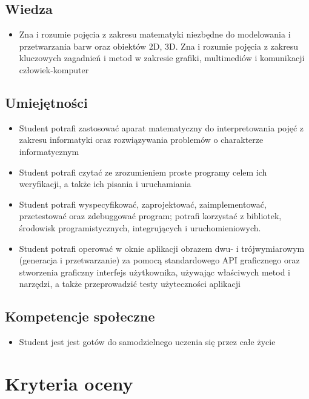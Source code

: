 \documentclass[12pt, a4paper]{article}
\begin{document}
\subsection*{Wiedza}
\begin{itemize}
  \item Zna i rozumie pojęcia z zakresu matematyki niezbędne do modelowania i przetwarzania barw oraz obiektów 2D, 3D. Zna i rozumie pojęcia z zakresu kluczowych zagadnień i metod w zakresie grafiki, multimediów i komunikacji człowiek-komputer
\end{itemize}

\subsection*{Umiejętności}
\begin{itemize}
  \item Student potrafi zastosować aparat matematyczny do interpretowania pojęć z zakresu informatyki oraz rozwiązywania problemów o charakterze informatycznym
  \item Student potrafi czytać ze zrozumieniem proste programy celem ich weryfikacji, a także ich pisania i uruchamiania
  \item Student potrafi wyspecyfikować,  zaprojektować, zaimplementować, przetestować oraz zdebuggować program; potrafi korzystać z bibliotek, środowisk programistycznych, integrujących i uruchomieniowych.
  \item Student potrafi operować w oknie aplikacji obrazem dwu- i trójwymiarowym (generacja i przetwarzanie) za pomocą standardowego API graficznego oraz stworzenia graficzny interfejs użytkownika, używając właściwych metod i narzędzi, a także przeprowadzić testy użyteczności aplikacji
\end{itemize}

\subsection*{Kompetencje społeczne}
\begin{itemize}
  \item Student jest jest gotów do samodzielnego uczenia się przez całe życie
\end{itemize}

\section{Kryteria oceny}
\end{document}
